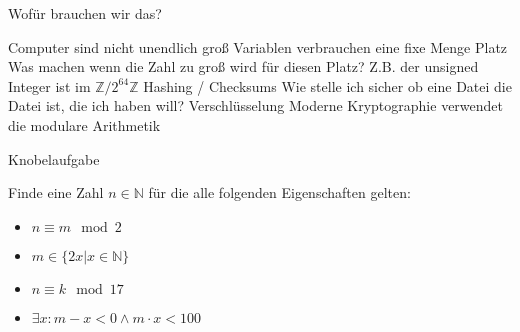 \begin{frame}{Wofür brauchen wir das?}
    \begin{outline}
        \1 Computer sind nicht unendlich groß
            \2 Variablen verbrauchen eine fixe Menge Platz
            \2 Was machen wenn die Zahl zu groß wird für diesen Platz?
            \2 Z.B. der unsigned Integer ist im $\mathbb Z / 2^{64}\mathbb Z$
            \pause
        \1 Hashing / Checksums
            \2 Wie stelle ich sicher ob eine Datei die Datei ist, die ich haben will?
            \pause
        \1 Verschlüsselung
            \2 Moderne Kryptographie verwendet die modulare Arithmetik 

    \end{outline}
\end{frame}

{
\begin{frame}[fragile]{Knobelaufgabe}
    \footnotesize
        \begin{block}{Finde eine Zahl $n \in \mathbb N$ für die alle folgenden Eigenschaften gelten:}
            \begin{multicols}{2}
            \begin{itemize}
                \item $n \equiv m \mod 2$
                \item $m \in \{2x | x \in \mathbb N\}$
                \item $n \equiv k \mod 17$
                \item  $\exists x: m-x < 0 \wedge m\cdot x < 100$
            \end{itemize}
            \end{multicols}
        \end{block}
        
\end{frame}

}